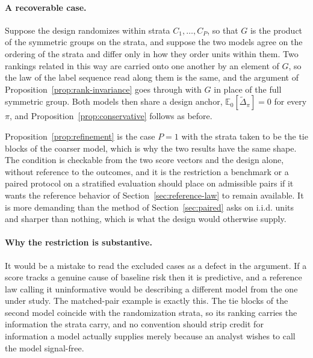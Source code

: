 \documentclass[11pt]{article}
\newcommand{\E}{\mathbb{E}}
\newcommand{\Dta}{\widetilde{\Delta}}
\theoremstyle{remark}
\begin{document}
\paragraph{A recoverable case.}
Suppose the design randomizes within strata $C_1,\ldots,C_P$, so that $G$ is the product of the symmetric groups on the strata, and suppose the two models agree on the ordering of the strata and differ only in how they order units within them. Two rankings related in this way are carried onto one another by an element of $G$, so the law of the label sequence read along them is the same, and the argument of Proposition~\ref{prop:rank-invariance} goes through with $G$ in place of the full symmetric group. Both models then share a design anchor, $\E_0[\Dta_\pi]=0$ for every $\pi$, and Proposition~\ref{prop:conservative} follows as before.

Proposition~\ref{prop:refinement} is the case $P=1$ with the strata taken to be the tie blocks of the coarser model, which is why the two results have the same shape. The condition is checkable from the two score vectors and the design alone, without reference to the outcomes, and it is the restriction a benchmark or a paired protocol on a stratified evaluation should place on admissible pairs if it wants the reference behavior of Section~\ref{sec:reference-law} to remain available. It is more demanding than the method of Section~\ref{sec:paired} asks on i.i.d. units and sharper than nothing, which is what the design would otherwise supply.

\paragraph{Why the restriction is substantive.}
It would be a mistake to read the excluded cases as a defect in the argument. If a score tracks a genuine cause of baseline risk then it is predictive, and a reference law calling it uninformative would be describing a different model from the one under study. The matched-pair example is exactly this. The tie blocks of the second model coincide with the randomization strata, so its ranking carries the information the strata carry, and no convention should strip credit for information a model actually supplies merely because an analyst wishes to call the model signal-free.
\end{document}
